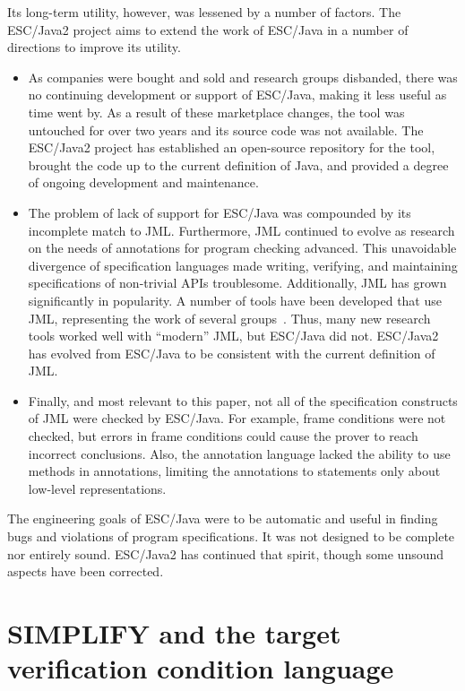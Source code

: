 \documentclass{sig-alternate}
\begin{document}
Its long-term utility, however, was lessened by a number of factors.  
The ESC/Java2 project \cite{CokKiniry04} aims to extend the work of ESC/Java 
in a number of directions to improve its utility.
\begin{itemize}
\item As companies were bought and sold and research groups
disbanded, there was no continuing development or support of 
ESC/Java, making it less useful as time went by.  As a result of these
marketplace changes, the tool was untouched for over two years and its
source code was not available.  The ESC/Java2 project has established
an open-source repository for the tool, brought the code up to the current
definition of Java, and provided a degree of ongoing development and
maintenance.
\item The problem of lack of support for ESC/Java was compounded by its
incomplete match to JML.  Furthermore, JML continued to evolve as
research on the needs of annotations for program checking advanced.
This unavoidable divergence of specification languages made writing,
verifying, and maintaining specifications of non-trivial APIs
troublesome.
Additionally, JML has grown significantly in popularity.  A number of
tools have been developed that use JML, representing the work of several
groups~\cite{Burdy-etal03,jmlpapers,Bogor03,NimmerErnst01,Leavens-etal00}.
Thus, many new research tools worked well with ``modern'' JML, but
ESC/Java did not.  ESC/Java2 has evolved from ESC/Java to be
consistent with the current definition of JML.
\item Finally, and most relevant to this paper,
not all of the specification constructs of JML were checked by ESC/Java.  For
example, frame conditions were not checked, but errors in frame
conditions could cause the prover to reach incorrect conclusions.
Also, the annotation language lacked the ability to use methods in
annotations, limiting the annotations to statements only about
low-level representations.
\end{itemize}

The engineering goals of ESC/Java were to be automatic and useful in finding bugs
and violations of program specifications.  It was not designed to be complete nor
entirely sound.  ESC/Java2 has continued that spirit, though some unsound aspects have
been corrected.

\section{SIMPLIFY and the target verification condition language}
\end{document}
